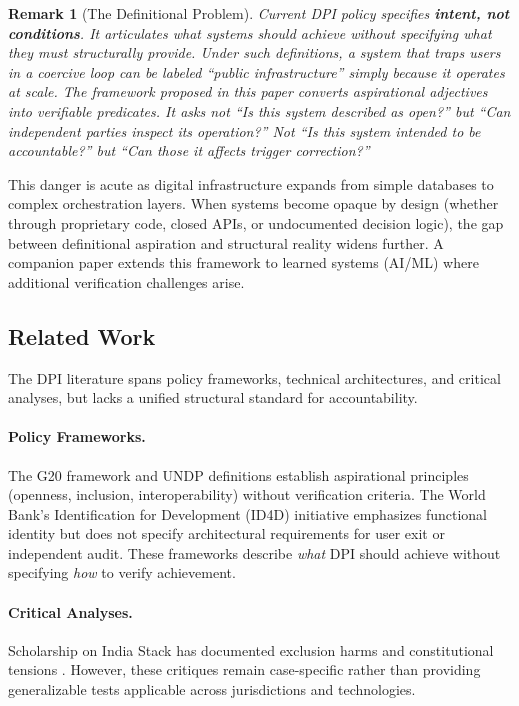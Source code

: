\documentclass{article}
\newtheorem{remark}{Remark}
\begin{document}
\begin{remark}[The Definitional Problem]
Current DPI policy specifies \textbf{intent, not conditions}. It articulates what systems \textit{should} achieve without specifying what they \textit{must} structurally provide. Under such definitions, a system that traps users in a coercive loop can be labeled ``public infrastructure'' simply because it operates at scale. The framework proposed in this paper converts aspirational adjectives into verifiable predicates. It asks not ``Is this system described as open?'' but ``Can independent parties inspect its operation?'' Not ``Is this system intended to be accountable?'' but ``Can those it affects trigger correction?''
\end{remark}

This danger is acute as digital infrastructure expands from simple databases to complex orchestration layers. When systems become opaque by design (whether through proprietary code, closed APIs, or undocumented decision logic), the gap between definitional aspiration and structural reality widens further. A companion paper extends this framework to learned systems (AI/ML) where additional verification challenges arise.

\subsection{Related Work}

The DPI literature spans policy frameworks, technical architectures, and critical analyses, but lacks a unified structural standard for accountability.

\paragraph{Policy Frameworks.} The G20 framework \citep{g20} and UNDP definitions \citep{undp} establish aspirational principles (openness, inclusion, interoperability) without verification criteria. The World Bank's Identification for Development (ID4D) initiative emphasizes functional identity but does not specify architectural requirements for user exit or independent audit. These frameworks describe \textit{what} DPI should achieve without specifying \textit{how} to verify achievement.

\paragraph{Critical Analyses.} Scholarship on India Stack has documented exclusion harms \citep{khera2019} and constitutional tensions \citep{bhatia2019}. However, these critiques remain case-specific rather than providing generalizable tests applicable across jurisdictions and technologies.
\end{document}
